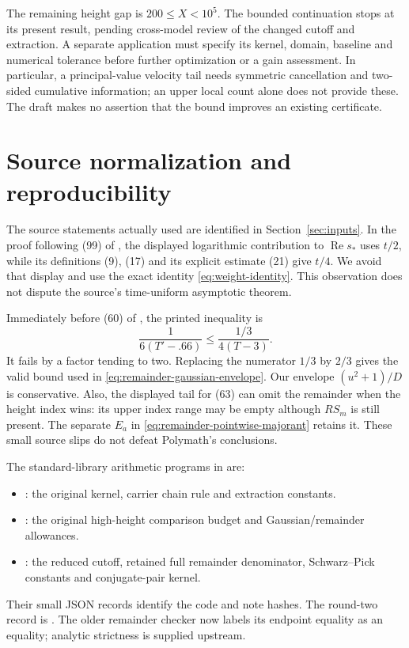 \documentclass[11pt]{article}
\theoremstyle{remark}
\numberwithin{equation}{section}
\begin{document}
The remaining height gap is $200\le X<10^5$. The bounded continuation
stops at its present result, pending cross-model review of the changed
cutoff and extraction. A separate application must specify its kernel,
domain, baseline and numerical tolerance before further optimization or
a gain assessment. In particular, a principal-value velocity tail needs
symmetric cancellation and two-sided cumulative information; an upper
local count alone does not provide these. The draft makes no assertion
that the bound improves an existing certificate.

\appendix
\section{Source normalization and reproducibility}\label{sec:replay}

The source statements actually used are identified in
Section~\ref{sec:inputs}. In the proof following (99) of
\cite{polymath}, the displayed logarithmic contribution to
$\operatorname{Re}s_*$ uses $t/2$, while its definitions (9), (17)
and its explicit estimate (21) give $t/4$. We avoid that display and
use the exact identity \eqref{eq:weight-identity}. This observation
does not dispute the source's time-uniform asymptotic theorem.

Immediately before (60) of \cite{polymath}, the printed inequality is
\[
 \frac1{6(T'-.66)}\le\frac{1/3}{4(T-3)}.
\]
It fails by a factor tending to two. Replacing the numerator $1/3$ by
$2/3$ gives the valid bound used in
\eqref{eq:remainder-gaussian-envelope}. Our envelope $(u^2+1)/D$ is
conservative. Also, the displayed tail for (63) can omit the remainder
when the height index wins: its upper index range may be empty although
$RS_m$ is still present. The separate $E_a$ in
\eqref{eq:remainder-pointwise-majorant} retains it. These small source
slips do not defeat Polymath's conclusions.

The standard-library arithmetic programs in  are:
\begin{itemize}
\item {}: the original kernel,
      carrier chain rule and extraction constants.
\item {}: the original high-height
      comparison budget and Gaussian/remainder allowances.
\item {}:
      the reduced cutoff, retained full remainder denominator,
      Schwarz--Pick constants and conjugate-pair kernel.
\end{itemize}
Their small JSON records identify the code and note hashes.
The round-two record is
.
The older remainder checker now labels its endpoint equality as an
equality; analytic strictness is supplied upstream.
\end{document}
